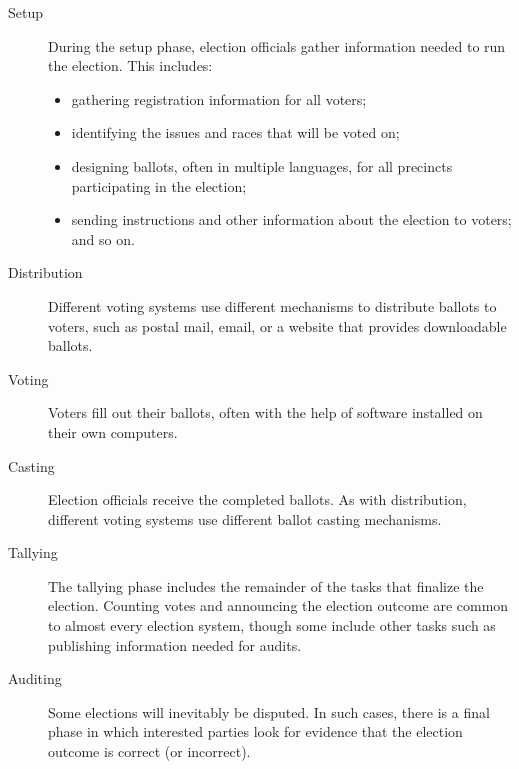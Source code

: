 \begin{description}
  \item[Setup] During the setup phase, election officials gather 
    information needed to run the election. This includes:
    \begin{itemize}
     \item gathering registration information for all voters;
     \item identifying the issues and races that will be voted on;
     \item designing ballots, often in multiple languages, for all
       precincts participating in the election;
     \item sending instructions and other information about the
       election to voters; and so on.
    \end{itemize}
  \item[Distribution] Different voting systems use different
    mechanisms to distribute ballots to voters, such as postal mail,
    email, or a website that provides downloadable ballots.
  \item[Voting] Voters fill out their ballots, often with the help of
    software installed on their own computers.
  \item[Casting] Election officials receive the completed ballots. As
    with distribution, different voting systems use different ballot
    casting mechanisms.
  \item[Tallying] The tallying phase includes the remainder of the
    tasks that finalize the election. Counting votes and announcing
    the election outcome are common to almost every election system,
    though some include other tasks such as publishing information
    needed for audits.
  \item[Auditing] Some elections will inevitably be disputed. In such
    cases, there is a final phase in which interested parties look for
    evidence that the election outcome is correct (or incorrect).
\end{description}

\clearpage\break

